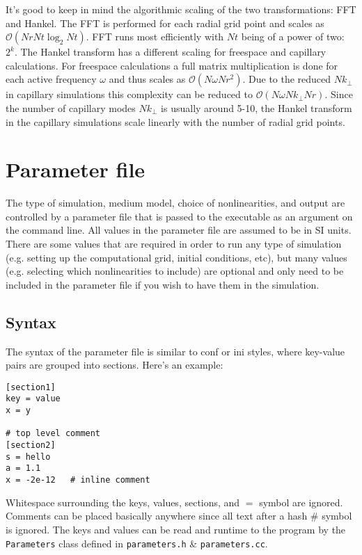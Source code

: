 \documentclass{article}
\begin{document}
It's good to keep in mind the algorithmic scaling of the two
transformations: FFT and Hankel. The FFT is performed for each radial
grid point and scales as $\mathcal{O}(Nr Nt\log_2 Nt)$. FFT runs most
efficiently with $Nt$ being of a power of two: $2^k$. The Hankel
transform has a different scaling for freespace and capillary
calculations. For freespace calculations a full matrix multiplication
is done for each active frequency $\omega$ and thus scales as
$\mathcal{O}(N\omega Nr^2)$. Due to the reduced $Nk_\perp$ in
capillary simulations this complexity can be reduced to
$\mathcal{O}(N\omega Nk_\perp Nr)$. Since the number of capillary modes
$Nk_\perp$ is usually around 5-10, the Hankel transform in the
capillary simulations scale linearly with the number of radial grid
points.

\section{Parameter file}
\label{sec:parameter-file}
The type of simulation, medium model, choice of nonlinearities, and
output are controlled by a parameter file that is passed to the
executable as an argument on the command line. All values in the
parameter file are assumed to be in SI units. There are some values
that are required in order to run any type of simulation (e.g. setting
up the computational grid, initial conditions, etc), but many values
(e.g. selecting which nonlinearities to include) are optional and only
need to be included in the parameter file if you wish to have them in
the simulation.

\subsection{Syntax}
The syntax of the parameter file is similar to conf or ini styles,
where key-value pairs are grouped into sections. Here's an example:
\begin{lstlisting}
[section1]
key = value 
x = y

# top level comment
[section2]
s = hello
a = 1.1
x = -2e-12   # inline comment
\end{lstlisting}

Whitespace surrounding the keys, values, sections, and $=$ symbol are
ignored. Comments can be placed basically anywhere since all text
after a hash \# symbol is ignored. The keys and values can be read and
runtime to the program by the \texttt{Parameters} class defined in
\texttt{parameters.h} \& \texttt{parameters.cc}.
\end{document}
